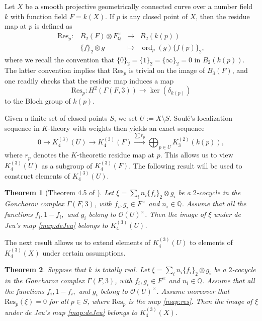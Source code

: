 \documentclass[11pt,a4,leqno]{amsart}
\theoremstyle{my theoremstyle}
\newtheorem{thm}{Theorem}[section]
\theoremstyle{dfn}
\theoremstyle{remark}
\renewcommand{\1}{\mathbbm{1}}
\newcommand{\Q}{\mathbb{Q}}
\numberwithin{equation}{section}
\newcommand{\ord}{\operatorname{ord}}
\begin{document}
Let $X$ be a smooth projective geometrically connected curve over a number field $k$ with function field $F=k(X)$. If $p$ is any closed point of $X$, then the residue map at $p$ is defined as
   \begin{equation}\label{map:res}
\begin{array}{cccc}
    \mathrm{Res}_p \colon & B_{2}(F) \otimes F_{\Q}^\times & \longrightarrow & B_2(k(p))  \\
     & \{ f \}_2 \otimes g &  \longmapsto & \ord_p(g) \{ f(p) \}_2,
\end{array}
\end{equation}
where we recall the convention that $\{ 0 \}_2=\{ 1 \}_2=\{ \infty \}_2=0$ in $B_2(k(p))$. The latter convention implies that $\mathrm{Res}_p$ is trivial on the image of $B_3(F)$, and one readily checks that the residue map induces a map
\begin{equation}\label{map:res_cohom}
    \mathrm{Res}_p \colon H^2(\Gamma(F,3)) \longrightarrow \ker(\delta_{k(p)})
\end{equation}
to the Bloch group of $k(p)$.

Given a finite set of closed points $S$, we set $U:=X\setminus S$. Soulé's localization sequence in $K$-theory with weights \cite[Remarques, p. 525]{Sou85} then yields an exact sequence 
\begin{equation*}
0 \longrightarrow K_4^{(3)}(U) \longrightarrow K_4^{(3)}(F) \overset{\sum r_p}{\longrightarrow} \bigoplus_{p\in U} K_3^{(2)}(k(p)),
\end{equation*}
where $r_p$ denotes the $K$-theoretic residue map at $p$. This allows us to view $K_4^{(3)}(U)$ as a subgroup of $K_4^{(3)}(F)$. The following result will be used to construct elements of $K_4^{(3)}(U)$. 

\begin{thm}[Theorem 4.5 of \cite{Bru20}]\label{thm:K4Y}
    Let $\xi=\sum_i n_i \{ f_i \}_2 \otimes g_i$ be a $2$-cocycle in the Goncharov complex $\Gamma(F, 3)$, with $f_i, g_i \in F^\times$ and $n_i \in \Q$. Assume
that all the functions $f_i, 1-f_i,$ and $g_i$ belong to $\mathcal{O}(U)^\times$. Then the image of $\xi$ under de Jeu’s
map \eqref{map:deJeu} belongs to $K_4^{(3)}(U)$.
\end{thm}

The next result allows us to extend elements of $K_4^{(3)}(U)$ to elements of $K_4^{(3)}(X)$ under certain assumptions.

\begin{thm}\label{rmk:K4X}
    Suppose that $k$ is totally real.
    Let $\xi=\sum_i n_i \{ f_i \}_2 \otimes g_i$ be a $2$-cocycle in the Goncharov complex $\Gamma(F, 3)$, with $f_i, g_i \in F^\times$ and $n_i \in \Q$. Assume
    that all the functions $f_i, 1-f_i,$ and $g_i$ belong to $\mathcal{O}(U)^\times$. Assume moreover that $\mathrm{Res}_p(\xi)=0$ for all $p\in S$, where $\mathrm{Res}_p$ is the map \eqref{map:res}. Then the image of $\xi$ under de Jeu’s map \eqref{map:deJeu} belongs to $K_4^{(3)}(X)$.
\end{thm}
\end{document}
